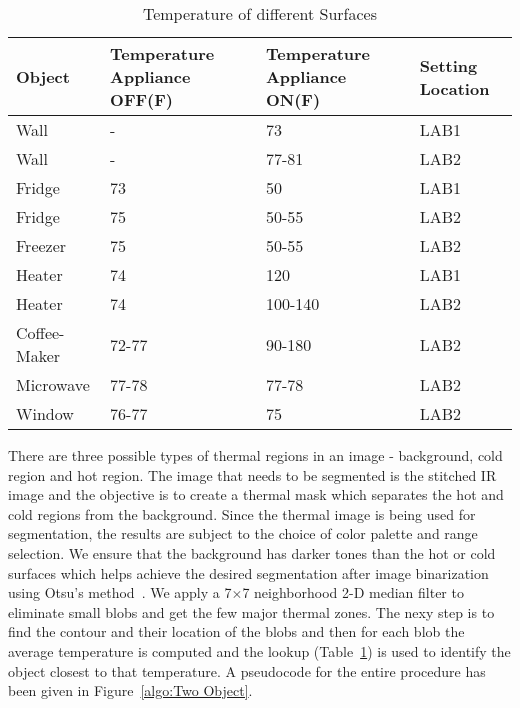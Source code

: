 \begin{table}[h!]
\centering
 \begin{tabular}{||p{1.3cm} | p{2cm} | p{2cm} | p{1cm}||}
 \hline
 Object & Temperature Appliance OFF(F) & Temperature Appliance ON(F) & Setting Location\\ [0.5ex]
 \hline\hline
 Wall  & - & 73 & LAB1\\
  \hline\hline
 Wall  & - & 77-81 & LAB2\\
  \hline
 Fridge & 73 & 50 & LAB1 \\
 \hline
 Fridge & 75  & 50-55 & LAB2 \\
 \hline 
 Freezer & 75  & 50-55 & LAB2 \\
 \hline
 Heater & 74 & 120 &  LAB1\\ 
 \hline
  Heater & 74 & 100-140 &  LAB2\\ 
 \hline
 Coffee-Maker & 72-77 & 90-180 &  LAB2\\
 \hline
 Microwave & 77-78 & 77-78 & LAB2\\
 \hline
 Window & 76-77 & 75 & LAB2\\ [1ex]
 \hline
 \end{tabular}
 \label{table:temp}
\caption{Temperature of different Surfaces}
\end{table}


 There are three possible types of thermal regions in an image - background, cold region and hot region. The image that needs to be segmented is the stitched IR image and the objective is to create a thermal mask which separates the hot and cold regions from the background. Since the thermal image is being used for segmentation, the results are subject to the choice of color palette and range selection.  We ensure that the background has darker tones than the hot or cold surfaces which helps achieve the desired segmentation after image binarization using Otsu's method~\cite{Otsu}. We apply a 7$\times$7 neighborhood 2-D median filter to eliminate small blobs and get the few major thermal zones. The nexy step is to find the contour and their location of the blobs and then for each blob the average temperature is computed and the lookup (Table~\ref{table:temp}) is used to identify the object closest to that temperature. A pseudocode for the entire procedure has been given in Figure~\ref{algo:Two Object}.
 

